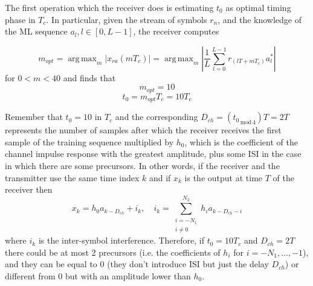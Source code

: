 \documentclass[10pt]{article}
\DeclareMathOperator*{\argmax}{arg\,max}
\newcommand{\lmod}[1] {_{\,\mathrm{mod}\,#1}}
\begin{document}
The first operation which the receiver does is estimating $t_0$ as optimal timing phase in $T_c$. In particular, given the stream of symbols $r_n$, and the knowledge of the ML sequence $a_l, l\in [0, L-1]$, the receiver computes

\begin{equation}
	m_{opt} = \argmax_{m} | x_{ra}(mT_c) | = \argmax_{m} | \frac{1}{L} \sum_{l = 0}^{L - 1} r_{(lT + mT_c)}a^*_l |
\end{equation}
for $ 0 < m < 40$ and finds that
\begin{equation}
	m_{opt} = 10
\end{equation}
\begin{equation}
	t_{0} = m_{opt}T_c = 10 T_c
\end{equation}

Remember that $t_0 = 10$ in $T_c$ and the corresponding $D_{ch} = ({t_0}\lmod{4})T = 2T$ represents the number of samples after which the receiver receives the first sample of the training sequence multiplied by $h_0$, which is the coefficient of the channel impulse response with the greatest amplitude, plus some ISI in the case in which there are some precursors. In other words, if the receiver and the transmitter use the same time index $k$ and if $x_k$ is the output at time $T$ of the receiver then
\begin{equation}
x_{k} = h_0a_{k-D_{ch}} + i_k, \quad i_k = \sum_{\substack{i = -N_1 \\ i \neq 0}}^{N_2} h_i a_{k-D_{ch}-i}
\end{equation}
where $i_k$ is the inter-symbol interference. Therefore, if $t_0 = 10T_c$ and $D_{ch} = 2T$ there could be at most 2 precursors (i.e. the coefficients of $h_i$ for $i = -N_1, \dots, -1$), and they can be equal to 0 (they don't introduce ISI but just the delay $D_{ch}$) or different from 0 but with an amplitude lower than $h_0$. 
\end{document}
